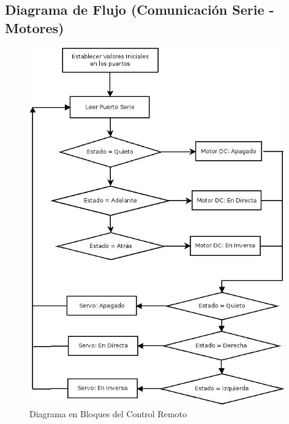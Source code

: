 \documentclass[a4paper,10pt]{article}
\begin{document}
			\subsection{Diagrama de Flujo (Comunicación Serie - Motores)}
				\begin{figure}[!htb]
						\centering
						\includegraphics[width=11cm]{Imagenes/DiagramaFlujoAutito.jpeg}
						\caption{Diagrama en Bloques del Control Remoto} \label{img003}
					\end{figure}
\end{document}
